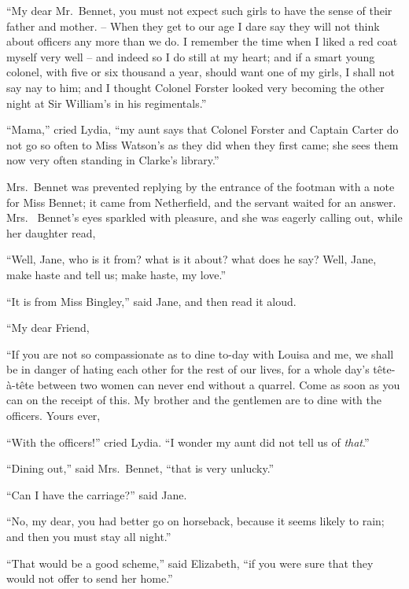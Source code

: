 “My dear Mr.\ Bennet, you must not expect such girls
to have the sense of their father and mother. -- When
they get to our age I dare say they will not think about
officers any more than we do. I remember the time when
I liked a red coat myself very well -- and indeed so I do
still at my heart; and if a smart young colonel, with
five or six thousand a year, should want one of my girls,
I shall not say nay to him; and I thought Colonel Forster
looked very becoming the other night at Sir William’s in
his regimentals.”

“Mama,” cried Lydia, “my aunt says that Colonel
Forster and Captain Carter do not go so often to Miss
Watson’s as they did when they first came; she sees
them now very often standing in Clarke’s library.”

Mrs.\ Bennet was prevented replying by the entrance of
the footman with a note for Miss Bennet; it came from
Netherfield, and the servant waited for an answer. Mrs.\ %
Bennet’s eyes sparkled with pleasure, and she was eagerly
calling out, while her daughter read,

“Well, Jane, who is it from? what is it about? what
does he say? Well, Jane, make haste and tell us; make
haste, my love.”

“It is from Miss Bingley,” said Jane, and then read
it aloud.

\begin{letter}
“My dear Friend,

“If you are not so compassionate as to dine to-day
with Louisa and me, we shall be in danger of hating each
other for the rest of our lives, for a whole day’s tête-à-tête
between two women can never end without a quarrel.
Come as soon as you can on the receipt of this. My
brother and the gentlemen are to dine with the officers.
Yours ever,

\end{letter}

“With the officers!” cried Lydia. “I wonder my
aunt did not tell us of \textit{that}.”

“Dining out,” said Mrs.\ Bennet, “that is very
unlucky.”

“Can I have the carriage?” said Jane.

“No, my dear, you had better go on horseback, because
it seems likely to rain; and then you must stay all night.”

“That would be a good scheme,” said Elizabeth, “if you
were sure that they would not offer to send her home.”

